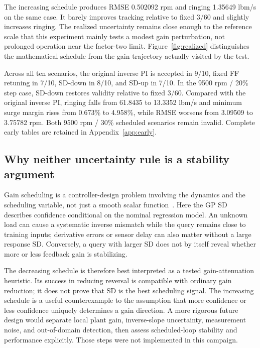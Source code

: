 The increasing schedule produces RMSE 0.502092 rpm and ringing 1.35649 lbm/s on the same case. It barely improves tracking relative to fixed 3/60 and slightly increases ringing. The realized uncertainty remains close enough to the reference scale that this experiment mainly tests a modest gain perturbation, not prolonged operation near the factor-two limit. Figure~\ref{fig:realized} distinguishes the mathematical schedule from the gain trajectory actually visited by the test.


Across all ten scenarios, the original inverse PI is accepted in 9/10, fixed FF retuning in 7/10, SD-down in 8/10, and SD-up in 7/10. In the 9500 rpm / 20\% step case, SD-down restores validity relative to fixed 3/60. Compared with the original inverse PI, ringing falls from 61.8435 to 13.3352 lbm/s and minimum surge margin rises from 0.673\% to 4.958\%, while RMSE worsens from 3.09509 to 3.75782 rpm. Both 9500 rpm / 30\% scheduled scenarios remain invalid. Complete early tables are retained in Appendix~\ref{app:early}.

\subsection{Why neither uncertainty rule is a stability argument}
Gain scheduling is a controller-design problem involving the dynamics and the scheduling variable, not just a smooth scalar function~\cite{scheduling}. Here the GP SD describes confidence conditional on the nominal regression model. An unknown load can cause a systematic inverse mismatch while the query remains close to training inputs; derivative errors or sensor delay can also matter without a large response SD. Conversely, a query with larger SD does not by itself reveal whether more or less feedback gain is stabilizing.

The decreasing schedule is therefore best interpreted as a tested gain-attenuation heuristic. Its success in reducing reversal is compatible with ordinary gain reduction; it does not prove that SD is the best scheduling signal. The increasing schedule is a useful counterexample to the assumption that more confidence or less confidence uniquely determines a gain direction. A more rigorous future design would separate local plant gain, inverse-slope uncertainty, measurement noise, and out-of-domain detection, then assess scheduled-loop stability and performance explicitly. Those steps were not implemented in this campaign.





